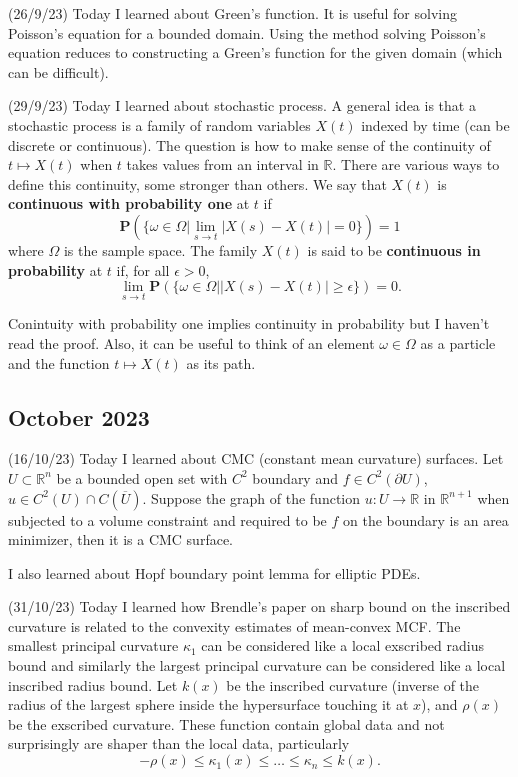 \documentclass[12pt,a4paper]{article}
\newcommand{\R}{\mathbb{R}}
\begin{document}
(26/9/23) Today I learned about Green's function. It is useful for solving Poisson's equation for a bounded domain. Using the method solving Poisson's equation reduces to constructing a Green's function for the given domain (which can be difficult).

(29/9/23) Today I learned about stochastic process. A general idea is that a stochastic process is a family of random variables $ X(t) $ indexed by time (can be discrete or continuous). The question is how to make sense of the continuity of  $ t \mapsto X(t) $ when $ t $ takes values from an interval in $ \R $. There are various ways to define this continuity, some stronger than others. We say that $ X(t) $ is \textbf{continuous with probability one} at $ t $ if 
\[ \textbf{P}  \left( \{\omega \in \Omega \big|  \lim_{s \to t} |X(s)- X(t)| = 0 \}\right)= 1  \]
 where $ \Omega $ is the sample space. The family $ X(t) $ is said to be \textbf{continuous in probability} at $ t $ if, for all $ \epsilon >0 $, 
 \[ \lim_{s \to t} \textbf{P} \left( \{ \omega \in \Omega \big| |X(s)- X(t)| \ge \epsilon \}\right) = 0.  \]

 Conintuity with probability one implies continuity in probability but I haven't read the proof. Also, it can be useful to think of an element $ \omega \in \Omega $ as a particle and the function $ t \mapsto X(t) $ as its path. 

\subsection*{October 2023}
\quad (16/10/23) Today I learned about CMC (constant mean curvature) surfaces. Let $ U \subset \R^{n} $ be a bounded open set with $ C^{2} $ boundary and $ f \in C^{2}( \partial U) $, $ u \in C^{2}(U) \cap C ( \overline{U})$. Suppose the graph of the function $ u : U \to \R $ in $ \R^{n+1} $ when subjected to a volume constraint and required to be $ f $ on the boundary is an area minimizer, then it is a CMC surface.

I also learned about Hopf boundary point lemma for elliptic PDEs.

(31/10/23) Today I learned how Brendle's paper on sharp bound on the inscribed curvature is related to the convexity estimates of mean-convex MCF. The smallest principal curvature $ \kappa_{1} $ can be considered like a local exscribed radius bound and similarly the largest principal curvature can be considered like a local inscribed radius bound. Let $ k(x) $ be the inscribed curvature (inverse of the radius of the largest sphere inside the hypersurface touching it at $ x $), and $ \rho(x) $ be the exscribed curvature. These function contain global data and not surprisingly are shaper than the local data, particularly 
\[ -\rho(x) \le \kappa_{1}(x) \le \dots \le \kappa_{n} \le k(x).\]
\end{document}

